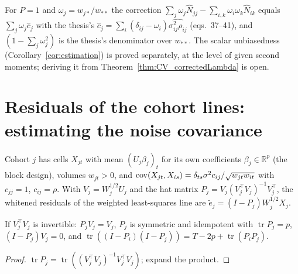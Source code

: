 \begin{remark}
  For $P = 1$ and $\omega_j = w_{j*}/w_{**}$ the correction
  $\sum_j\omega_j\hat N_{jj} - \sum_{i,k}\omega_i\omega_k\hat N_{ik}$ equals
  $\sum_j \omega_j\hat c_j$ with the thesis's $\hat c_j = \sum_i(\delta_{ij} - \omega_i)
  \widehat{\sigma^2_{ij}\rho_{ij}}$ (eqs.~37--41), and $(1 - \sum_j\omega_j^2)$ is the thesis's
  denominator over $w_{**}$. The scalar unbiasedness (Corollary~\ref{cor:estimation}) is
  proved separately, at the level of given second moments; deriving it from
  Theorem~\ref{thm:CV_correctedLambda} is open.
\end{remark}

\section*{Residuals of the cohort lines: estimating the noise covariance}

\begin{definition}\label{def:LR_fit}
  \leanok
  Cohort $j$ has cells $X_{jt}$ with mean $(U_j\beta_j)_t$ for its own coefficients
  $\beta_j \in \mathbb R^p$ (the block design), volumes $w_{jt} > 0$, and
  $\operatorname{cov}(X_{jt}, X_{is}) = \delta_{ts}\sigma^2 c_{ij}/\sqrt{w_{jt}w_{it}}$ with $c_{jj} = 1$,
  $c_{ij} = \rho$. With $V_j = W_j^{1/2}U_j$ and the hat matrix
  $P_j = V_j(V_j^\top V_j)^{-1}V_j^\top$, the whitened residuals of the weighted least-squares
  line are $\tilde e_j = (I - P_j)W_j^{1/2}X_j$.
\end{definition}

\begin{lemma}\label{lem:LR_hat}
  \leanok
  If $V_j^\top V_j$ is invertible: $P_jV_j = V_j$, $P_j$ is symmetric and idempotent with
  $\operatorname{tr}P_j = p$, $(I - P_j)V_j = 0$, and
  $\operatorname{tr}((I - P_i)(I - P_j)) = T - 2p + \operatorname{tr}(P_iP_j)$.
\end{lemma}
\begin{proof}
  \leanok
  $\operatorname{tr}P_j = \operatorname{tr}((V_j^\top V_j)^{-1}V_j^\top V_j)$; expand the product.
\end{proof}

